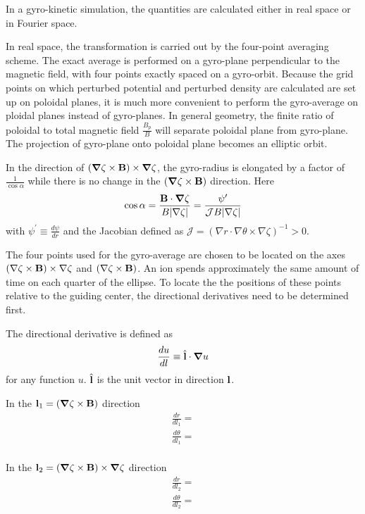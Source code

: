 \documentclass{report}
\newcommand{\ff}[2]{\frac{#1}{#2}}
\def\B{\mbox{\bf B}}
\def\l{\mbox{\bf l}}
\begin{document}
In a gyro-kinetic simulation, the quantities are calculated either in real space
or in Fourier space.

In real space, the transformation is carried out by the four-point averaging scheme.
The exact average is performed on a gyro-plane perpendicular to the magnetic field,
with four points exactly spaced on a gyro-orbit.
Because the grid points on which perturbed potential and perturbed density
are calculated are set up on poloidal planes,
it is much more convenient to perform the gyro-average on ploidal planes 
instead of gyro-planes.
In general geometry, the finite ratio of poloidal to total magnetic field 
$\ff{B_p}{B}$ will separate poloidal plane from gyro-plane. 
The projection of gyro-plane onto poloidal plane becomes an elliptic orbit.

In the direction of 
$(\boldsymbol{\nabla} \zeta \times \B) \times \boldsymbol{\nabla} \zeta$,
the gyro-radius is elongated by a factor of $\ff{1}{\cos\alpha}$
while there is no change in the 
$(\boldsymbol{\nabla} \zeta \times \B)$ direction.
Here
$$
\cos\alpha = \ff{\B \cdot \boldsymbol{\nabla}\zeta }{ B |\nabla\zeta| }
= \ff{\psi^\prime }{ \mathcal{J} B | \nabla \zeta | }
$$
with $\psi^\prime \equiv \ff{d\psi}{dr}$ and 
the Jacobian defined as 
$\mathcal{J} = (\nabla r \cdot \nabla \theta \times \nabla \zeta)^{-1} > 0 $.

The four points used for the gyro-average are chosen to be located on the axes
$(\nabla \zeta \times \B) \times \nabla \zeta$ and
$(\nabla \zeta \times \B)$.
An ion spends approximately the same amount of time on each quarter of the ellipse.
To locate the the positions of these points relative to the guiding center,
the directional derivatives need to be determined first.

The directional derivative is defined as
$$
\ff{du}{dl} \equiv \hat{\l} \cdot \boldsymbol{\nabla} u
$$
for any function $u$. 
$\hat{\l}$ is the unit vector in direction $\l$.

In the 
$\l_1 = (\boldsymbol{\nabla} \zeta \times \B)$
direction
$$
\begin{array}{l}
\ff{dr}{dl_1} = \\
\ff{d\theta}{dl_1} = \\
\end{array}
$$

In the 
$\l_2 = (\boldsymbol{\nabla} \zeta \times \B) \times \boldsymbol{\nabla} \zeta$
direction
$$
\begin{array}{l}
\ff{dr}{dl_2} = \\
\ff{d\theta}{dl_2} = \\
\end{array}
$$
\end{document}
